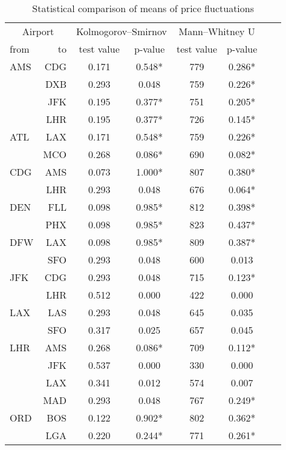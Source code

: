\begin{table}[h]
    \begin{center}
        \begin{tabular}{l r c c c c c c}
            \toprule
            \multicolumn{2}{c}{Airport}  &  \multicolumn{2}{c}{Kolmogorov--Smirnov} & \multicolumn{2}{c}{Mann--Whitney U} \\[.4ex]
            from  &  to  &  test value   &  p-value  & test value  &  p-value  \\
            \midrule
AMS  &  CDG  &  0.171  &  0.548*  &  779  &  0.286*  \\
~    &  DXB  &  0.293  &  0.048  &  759  &  0.226*  \\
~    &  JFK  &  0.195  &  0.377*  &  751  &  0.205*  \\
~    &  LHR  &  0.195  &  0.377*  &  726  &  0.145*  \\[.5ex]
ATL  &  LAX  &  0.171  &  0.548*  &  759  &  0.226*  \\
~    &  MCO  &  0.268  &  0.086*  &  690  &  0.082*  \\[.5ex]
CDG  &  AMS  &  0.073  &  1.000*  &  807  &  0.380*  \\
~    &  LHR  &  0.293  &  0.048  &  676  &  0.064*  \\[.5ex]
DEN  &  FLL  &  0.098  &  0.985*  &  812  &  0.398*  \\
~    &  PHX  &  0.098  &  0.985*  &  823  &  0.437*  \\[.5ex]
DFW  &  LAX  &  0.098  &  0.985*  &  809  &  0.387*  \\
~    &  SFO  &  0.293  &  0.048  &  600  &  0.013  \\[.5ex]
JFK  &  CDG  &  0.293  &  0.048  &  715  &  0.123*  \\
~    &  LHR  &  0.512  &  0.000  &  422  &  0.000  \\[.5ex]
LAX  &  LAS  &  0.293  &  0.048  &  645  &  0.035  \\
~    &  SFO  &  0.317  &  0.025  &  657  &  0.045  \\[.5ex]
LHR  &  AMS  &  0.268  &  0.086*  &  709  &  0.112*  \\
~    &  JFK  &  0.537  &  0.000  &  330  &  0.000  \\
~    &  LAX  &  0.341  &  0.012  &  574  &  0.007  \\
~    &  MAD  &  0.293  &  0.048  &  767  &  0.249*  \\[.5ex]
ORD  &  BOS  &  0.122  &  0.902*  &  802  &  0.362*  \\
~    &  LGA  &  0.220  &  0.244*  &  771  &  0.261*  \\
            \bottomrule
        \end{tabular}
        \caption{Statistical comparison of means of price fluctuations}
        \label{tbl:StatisicalComparison}
    \end{center}
\end{table}



